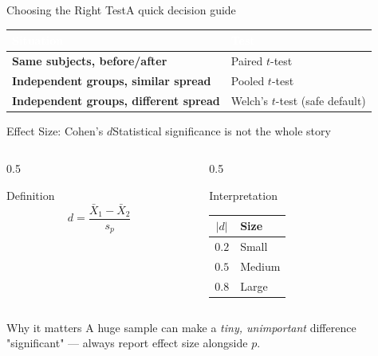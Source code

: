 \documentclass[aspectratio=169,11pt]{beamer}
\begin{document}
\begin{frame}{Choosing the Right Test}{A quick decision guide}
  \small
  \renewcommand{\arraystretch}{1.3}
  \begin{center}
  \begin{tabularx}{\textwidth}{@{}>{\bfseries}l >{\raggedright\arraybackslash}X@{}}
    \toprule
    \rowcolor{PrimaryDark}
    \textcolor{white}{Situation} & \textcolor{white}{Test} \\
    \midrule
    Same subjects, before/after & Paired $t$-test \\
    \rowcolor{PrimaryLight!25}
    Independent groups, similar spread & Pooled $t$-test \\
    Independent groups, different spread & Welch's $t$-test (safe default) \\
    \bottomrule
  \end{tabularx}
  \end{center}
\end{frame}

\begin{frame}{Effect Size: Cohen's $d$}{Statistical significance is not the whole story}
  \begin{columns}[T]
    \begin{column}{0.5\textwidth}
      \begin{block}{Definition}
        \[ d = \frac{\bar X_1 - \bar X_2}{s_p} \]
      \end{block}
    \end{column}
    \begin{column}{0.5\textwidth}
      \begin{exampleblock}{Interpretation}
        \small
        \renewcommand{\arraystretch}{1.2}
        \begin{tabular}{@{}cl@{}}
          \toprule
          $|d|$ & Size \\
          \midrule
          $0.2$ & Small \\
          $0.5$ & Medium \\
          $0.8$ & Large \\
          \bottomrule
        \end{tabular}
      \end{exampleblock}
    \end{column}
  \end{columns}
  \begin{alertblock}{Why it matters}
    \small A huge sample can make a \emph{tiny, unimportant} difference
    "significant" — always report effect size alongside $p$.
  \end{alertblock}
\end{frame}
\end{document}
